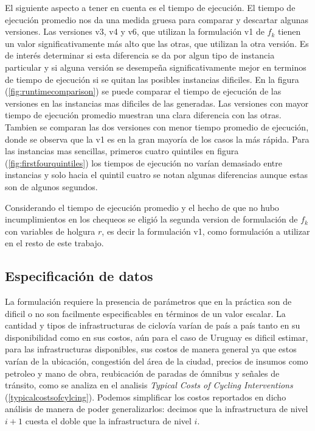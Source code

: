 \documentclass{article}
\begin{document}
  El siguiente aspecto a tener en cuenta es el tiempo de ejecución. El tiempo de ejecución promedio nos da una medida gruesa para comparar y descartar algunas versiones. Las versiones v3, v4 y v6, que utilizan la formulación v1 de $f_k$ tienen un valor significativamente más alto que las otras, que utilizan la otra versión. Es de interés determinar si esta diferencia se da por algun tipo de instancia particular y si alguna versión se desempeña significativamente mejor en terminos de tiempo de ejecución si se quitan las posibles instancias dificiles. En la figura (\ref{fig:runtimecomparison}) se puede comparar el tiempo de ejecución de las versiones en las instancias mas dificiles de las generadas. Las versiones con mayor tiempo de ejecución promedio muestran una clara diferencia con las otras. Tambien se comparan las dos versiones con menor tiempo promedio de ejecución, donde se observa que la v1 es en la gran mayoría de los casos la más rápida. Para las instancias mas sencillas, primeros cuatro quintiles en figura (\ref{fig:firstfourquintiles}) los tiempos de ejecución no varían demasiado entre instancias y solo hacia el quintil cuatro se notan algunas diferencias aunque estas son de algunos segundos.

  Considerando el tiempo de ejecución promedio y el hecho de que no hubo incumplimientos en los chequeos se eligió la segunda version de formulación de $f_k$ con variables de holgura $r$, es decir la formulación v1, como formulación a utilizar en el resto de este trabajo.

  \subsection*{Especificación de datos}

  La formulación requiere la presencia de parámetros que en la práctica son de dificil o no son facilmente especificables en términos de un valor escalar. La cantidad y tipos de infrastructuras de ciclovía varían de país a país tanto en su disponibilidad como en sus costos, aún para el caso de Uruguay es dificil estimar, para las infrastructuras disponibles, sus costos de manera general ya que estos varían de la ubicación, congestión del área de la ciudad, precios de insumos como petroleo y mano de obra, reubicación de paradas de ómnibus y señales de tránsito, como se analiza en el analisis {\it Typical Costs of Cycling Interventions} (\ref{typicalcostsofcylcing}). Podemos simplificar los costos reportados en dicho análisis de manera de poder generalizarlos: decimos que la infrastructura de nivel $i+1$ cuesta el doble que la infrastructura de nivel $i$.
\end{document}
